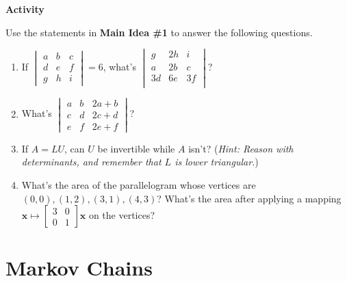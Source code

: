 \documentclass[titlepage, a4paper, 10pt]{article}
\renewcommand{\vec}[1]{\mathbf{#1}}
\newcounter{activity}
\newenvironment{newactivity}
{
	\noindent\textbf{Activity \theactivity}
}
{
\stepcounter{activity}
\par
}
\begin{document}
    \begin{newactivity}
        Use the statements in
        \textbf{Main Idea \#1} to answer the 
        following questions.

        \begin{enumerate}
            \item If \(
                \begin{vmatrix}
                    a & b & c \\
                    d & e & f \\
                    g & h & i
                \end{vmatrix} = 6
                \), what's \(
                \begin{vmatrix}
                    g &  2h & i \\
                    a &  2b & c \\
                    3d & 6e & 3f \\
                \end{vmatrix}
                \)?
            \item What's 
                \(\begin{vmatrix}
                    a & b & 2a + b \\
                    c & d & 2c + d \\
                    e & f & 2e + f
            \end{vmatrix}\)?
            \item If \(A = LU\), can \(U\) be 
                  invertible while \(A\) isn't?
                  (\textit{Hint: Reason with 
                  determinants, and remember 
                  that \(L\) is lower 
                  triangular.})
            \item What's the area of the 
                  parallelogram whose vertices 
                  are \((0, 0), (1, 2), (3, 1), (4, 3)\)? What's the area after
                  applying a mapping \(\vec{x} \mapsto \begin{bmatrix}
                      3 & 0 \\ 0 & 1
                  \end{bmatrix}\vec{x}\) on
                  the vertices?
        \end{enumerate}
    \end{newactivity}

    \part{Markov Chains}
\end{document}
